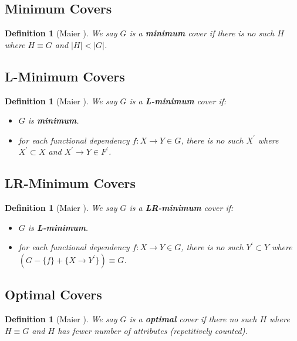 \documentclass[11pt]{book}
\newtheorem{mydef}[thm]{Definition}
\begin{document}
\subsection{Minimum Covers}

\begin{mydef}[Maier \cite{maier1980minimum}]
We say $G$ is a \textbf{minimum} cover if there is no such $H$ where $H \equiv G$ and $\lvert H \rvert < \lvert G \rvert$.
\end{mydef}

\subsection{L-Minimum Covers}

\begin{mydef}[Maier \cite{maier1980minimum}]
We say $G$ is a \textbf{L-minimum} cover if:
  \begin{itemize}
  	\item $G$ is \textbf{minimum}.
  	\item for each functional dependency $f: X \rightarrow Y \in G$, there is no such $X^{'}$ where $X^{'} \subset X$ and $X^{'} \rightarrow Y \in F^{'}$.
  \end{itemize}
\end{mydef}

\subsection{LR-Minimum Covers}

\begin{mydef}[Maier \cite{maier1980minimum}]
We say $G$ is a \textbf{LR-minimum} cover if:
  \begin{itemize}
  	\item $G$ is \textbf{L-minimum}.
  	\item for each functional dependency $f: X \rightarrow Y \in G$, there is no such $Y^{'} \subset Y$ where $(G - \{f\} + \{X \rightarrow Y^{'}\}) \equiv G$.
  \end{itemize}
\end{mydef}

\subsection{Optimal Covers}

\begin{mydef}[Maier \cite{maier1980minimum}]
We say $G$ is a \textbf{optimal} cover if there no such $H$ where $H \equiv G$ and $H$ has fewer number of attributes (repetitively counted).
\end{mydef}
\end{document}
